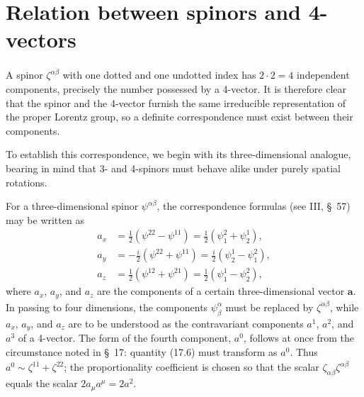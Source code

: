 
\section{Relation between spinors and 4-vectors}

A spinor $\zeta^{\alpha\dot\beta}$ with one dotted and one undotted index has $2\cdot2=4$ independent components, precisely the number possessed by a 4-vector. It is therefore clear that the spinor and the 4-vector furnish the same irreducible representation of the proper Lorentz group, so a definite correspondence must exist between their components.

To establish this correspondence, we begin with its three-dimensional analogue, bearing in mind that 3- and 4-spinors must behave alike under purely spatial rotations.

For a three-dimensional spinor $\psi^{\alpha\beta}$, the correspondence formulas (see III, \S~57) may be written as
\[
\begin{aligned}
a_x&=\frac12(\psi^{22}-\psi^{11})=\frac12(\psi^2_1+\psi^1_2),\\
a_y&=-\frac{i}{2}(\psi^{22}+\psi^{11})=\frac{i}{2}(\psi^1_2-\psi^2_1),\\
a_z&=\frac12(\psi^{12}+\psi^{21})=\frac12(\psi^1_1-\psi^2_2),
\end{aligned}
\]
where $a_x$, $a_y$, and $a_z$ are the components of a certain three-dimensional vector $\mathbf a$. In passing to four dimensions, the components $\psi^\alpha_{\beta}$ must be replaced by $\zeta^{\alpha\dot\beta}$, while $a_x$, $a_y$, and $a_z$ are to be understood as the contravariant components $a^1$, $a^2$, and $a^3$ of a 4-vector. The form of the fourth component, $a^0$, follows at once from the circumstance noted in \S~17: quantity (17.6) must transform as $a^0$. Thus $a^0\sim\zeta^{1\dot1}+\zeta^{2\dot2}$; the proportionality coefficient is chosen so that the scalar $\zeta_{\alpha\dot\beta}\zeta^{\alpha\dot\beta}$ equals the scalar $2a_\mu a^\mu=2a^2$.

